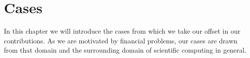 \chapter{Cases}

In this chapter we will introduce the cases from which we take our offset in
our contributions. As we are motivated by financial problems, our cases are
drawn from that domain and the surrounding domain of scientific computing in
general.




